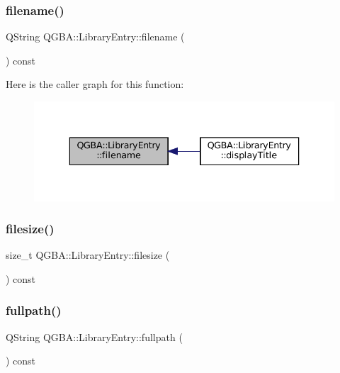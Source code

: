 \subsubsection{\texorpdfstring{filename()}{filename()}}
{\footnotesize\ttfamily Q\+String Q\+G\+B\+A\+::\+Library\+Entry\+::filename (\begin{DoxyParamCaption}{ }\end{DoxyParamCaption}) const\hspace{0.3cm}{\ttfamily [inline]}}

Here is the caller graph for this function\+:
\nopagebreak
\begin{figure}[H]
\begin{center}
\leavevmode
\includegraphics[width=336pt]{class_q_g_b_a_1_1_library_entry_a056aa92a8154018eb01ccc3323e88cd4_icgraph}
\end{center}
\end{figure}
\mbox{\label{class_q_g_b_a_1_1_library_entry_a2883f7001d722ba9ac4c0b6c8e9fa846}} 
\subsubsection{\texorpdfstring{filesize()}{filesize()}}
{\footnotesize\ttfamily size\+\_\+t Q\+G\+B\+A\+::\+Library\+Entry\+::filesize (\begin{DoxyParamCaption}{ }\end{DoxyParamCaption}) const\hspace{0.3cm}{\ttfamily [inline]}}

\mbox{\label{class_q_g_b_a_1_1_library_entry_aedd94e847ec68b0df3465766915bb55e}} 
\subsubsection{\texorpdfstring{fullpath()}{fullpath()}}
{\footnotesize\ttfamily Q\+String Q\+G\+B\+A\+::\+Library\+Entry\+::fullpath (\begin{DoxyParamCaption}{ }\end{DoxyParamCaption}) const\hspace{0.3cm}{\ttfamily [inline]}}

